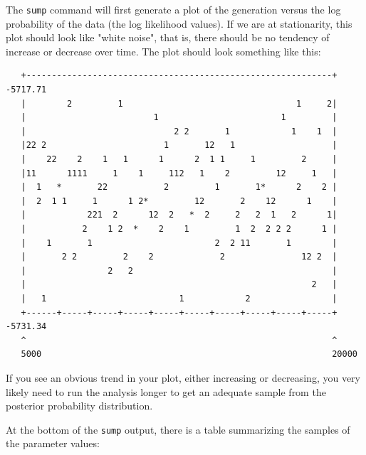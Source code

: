 \documentclass[12pt]{book}
\begin{document}
The \texttt{sump} command will first generate a plot of the generation versus the log probability of the 
data (the log likelihood values). If we are at stationarity, this plot should look like "white noise", that 
is, there should be no tendency of increase or decrease over time. The plot should look something like this:

\begin{singlespacing}
\small
\begin{verbatim}
   +------------------------------------------------------------+ -5717.71
   |        2         1                                  1     2|
   |                         1                        1         |
   |                             2 2       1            1    1  |
   |22 2                       1       12   1                   |
   |    22    2    1   1      1      2  1 1     1         2     |
   |11      1111     1    1     112   1    2         12     1   |
   |  1   *       22           2         1       1*      2    2 |
   |  2  1 1     1      1 2*         12       2    12      1    |
   |            221  2      12  2   *  2     2   2  1   2      1|
   |           2    1 2  *    2    1         1  2  2 2 2      1 |
   |    1       1                        2  2 11       1        |
   |       2 2         2    2             2               12 2  |
   |                2   2                                       |
   |                                                        2   |
   |   1                          1            2                |
   +------+-----+-----+-----+-----+-----+-----+-----+-----+-----+ -5731.34
   ^                                                            ^
   5000                                                         20000
\end{verbatim}
\normalsize
\end{singlespacing}

If you see an obvious trend in your plot, either increasing or decreasing, you very likely need to run the 
analysis longer to get an adequate sample from the posterior probability distribution.

At the bottom of the \texttt{sump} output, there is a table summarizing the samples of the parameter values:
\end{document}
